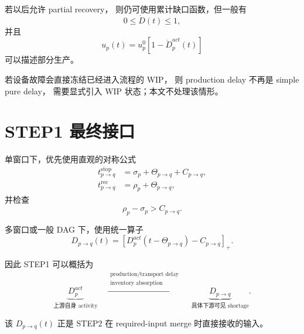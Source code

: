 \documentclass[UTF8,11pt]{ctexart}
\begin{document}
若以后允许 partial recovery，
则仍可使用累计缺口函数，但一般有
\[
0\le \dot D(t)\le1,
\]
并且
\[
u_p(t)=u_p^0[1-\dot D_p^{act}(t)]
\]
可以描述部分生产。

若设备故障会直接冻结已经进入流程的 WIP，
则 production delay 不再是 simple pure delay，
需要显式引入 WIP 状态；本文不处理该情形。

\section{STEP1 最终接口}

单窗口下，优先使用直观的对称公式
\[
\boxed{
\begin{aligned}
t_{p\to q}^{\mathrm{stop}}
&=
\sigma_p+\Theta_{p\to q}+C_{p\to q},
\\
t_{p\to q}^{\mathrm{rec}}
&=
\rho_p+\Theta_{p\to q},
\end{aligned}
}
\]
并检查
\[
\rho_p-\sigma_p>C_{p\to q}.
\]

多窗口或一般 DAG 下，使用统一算子
\[
\boxed{
D_{p\to q}(t)
=
\left[
D_p^{act}(t-\Theta_{p\to q})
-C_{p\to q}
\right]_+.
}
\]

因此 STEP1 可以概括为
\[
\boxed{
\underbrace{D_p^{act}}_{\text{上游自身 activity}}
\quad
\xrightarrow{
\substack{
\text{production/transport delay}\\
\text{inventory absorption}
}}
\quad
\underbrace{D_{p\to q}}_{\text{具体下游可见 shortage}}.
}
\]

该 \(D_{p\to q}(t)\) 正是 STEP2 在 required-input merge 时直接接收的输入。
\end{document}
